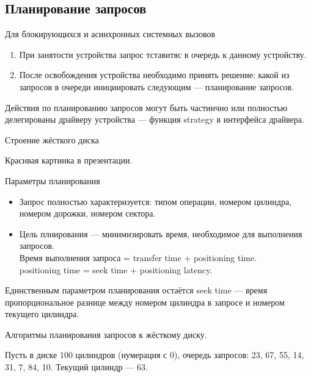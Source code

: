 \documentclass[12pt, a4paper]{article}
\begin{document}
    \subsection{Планирование запросов}
    Для блокирующихся и асинхронных системных вызовов 
    \begin{enumerate}
        \item При занятости устройства запрос тставитяс в очередь к данному устройству.
        \item После освобождения устройства необходимо принять решение: какой из запросов в очереди инициировать следующим --- планирование запросов.
    \end{enumerate}
    Действия по планированию запросов могут быть частинчно или полностью делегированы драйверу устройства --- функция strategy в интерфейса драйвера.
    \begin{center}
        Строение жёсткого диска
    \end{center}
    Красивая картинка в презентации.
    \begin{center}
        Параметры планирования
    \end{center}
    \begin{itemize}
        \item Запрос полностью характеризуется: типом операции, номером цилиндра, номером дорожки, номером сектора.
        \item Цель плнирования --- минимизировать время, необходимое для выполнения запросов.\\
        Время выполнения запроса = transfer time + positioning time.\\
        positioning time = seek time  + positioning latency.
    \end{itemize}
    Единственным параметром планирования остаётся seek time --- время пропорциональное разнице между номером цилиндра в запросе и номером текущего цилиндра.
    \begin{center}
        Алгоритмы планирования запросов к жёсткому диску.
    \end{center}
    Пусть в диске 100 цилиндров (нумерация с 0), очередь запросов: 23, 67, 55, 14, 31, 7, 84, 10. Текущий цилиндр --- 63.
\end{document}
